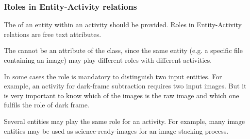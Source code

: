 \subsubsection{Roles in Entity-Activity relations}
\label{sec:roles}

The  of an entity within an activity should be provided. 
Roles in Entity-Activity relations are free text attributes.

The  cannot be an attribute of the  class, since the same entity (e.g. a specific file containing an image) may play different roles with different activities. 

In some cases the role is mandatory to distinguish two input entities. For example, an activity for dark-frame subtraction requires two input images. But it is very important to know which of the images is the raw image and which one fulfils the role of dark frame.

Several entities may play the same role for an activity. For example, many image entities may be used as science-ready-images for an image stacking process. 









